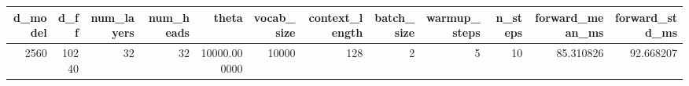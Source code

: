 \begin{tabular}{rrrrrrrrrrrr}
\toprule
d_model & d_ff & num_layers & num_heads & theta & vocab_size & context_length & batch_size & warmup_steps & n_steps & forward_mean_ms & forward_std_ms \\
\midrule
2560 & 10240 & 32 & 32 & 10000.000000 & 10000 & 128 & 2 & 5 & 10 & 85.310826 & 92.668207 \\
\bottomrule
\end{tabular}

